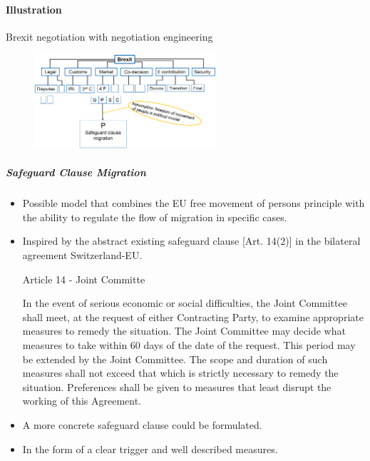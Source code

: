 \paragraph{Illustration}
Brexit negotiation with negotiation engineering

\begin{figure}[h]
    \centering
    \includegraphics[width=0.6\textwidth]{Pictures/Brexit.png}
\end{figure}

\subparagraph{Safeguard Clause Migration}

\begin{itemize}
    \item Possible model that combines the EU free movement of persons
        principle with the ability to regulate the flow of migration
        in specific cases.
    \item Inspired by the abstract existing safeguard clause [Art. 14(2)] in
        the bilateral agreement Switzerland-EU.

        \vspace{1\baselineskip}

        Article 14 - Joint Committe

        In the event of serious economic or social difficulties, the
        Joint Committee shall meet, at the request of either Contracting
        Party, to examine appropriate measures to remedy the situation.
        The Joint Committee may decide what measures to take within
        $60$ days of the date of the request. This period may be extended by
        the Joint Committee. The scope and duration of such measures shall
        not exceed that which is strictly necessary to remedy the situation.
        Preferences shall be given to measures that least disrupt the
        working of this Agreement.

    \item A more concrete safeguard clause could be formulated.
    \item In the form of a clear trigger and well described measures.
\end{itemize}


